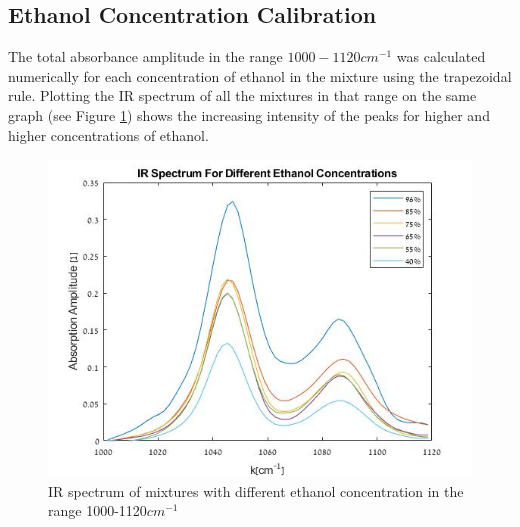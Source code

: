 \documentclass[reprint,amsmath,amssymb,aps, prl,superscriptaddress]{revtex4-2}
\begin{document}
\subsection{Ethanol Concentration Calibration}
The total absorbance amplitude in the range $1000-1120 cm^{-1}$ was calculated numerically
for each concentration of ethanol in the mixture using the trapezoidal rule\cite{numerical}.
Plotting the IR spectrum of all the mixtures in that range
on the same graph (see Figure \ref{fig:EthanolMixtures})
shows the increasing intensity of the peaks for higher and higher concentrations of ethanol. 
\begin{figure}[H]
    \includegraphics[width=\linewidth]{Images/EthanolAbsorption.jpg}
    \caption{IR spectrum of mixtures with different ethanol concentration in the range 1000-1120$cm^{-1}$ }
    \label{fig:EthanolMixtures}
    \centering
\end{figure}
\end{document}
